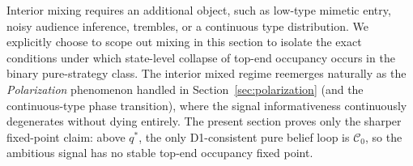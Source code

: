 Interior mixing requires an additional object, such as low-type mimetic entry, noisy audience inference, trembles, or a continuous type distribution. We explicitly choose to scope out mixing in this section to isolate the exact conditions under which state-level collapse of top-end occupancy occurs in the binary pure-strategy class. The interior mixed regime reemerges naturally as the \emph{Polarization} phenomenon handled in Section~\ref{sec:polarization} (and the continuous-type phase transition), where the signal informativeness continuously degenerates without dying entirely. The present section proves only the sharper fixed-point claim: above \(q^*\), the only D1-consistent pure belief loop is \(\mathcal C_0\), so the ambitious signal has no stable top-end occupancy fixed point.
